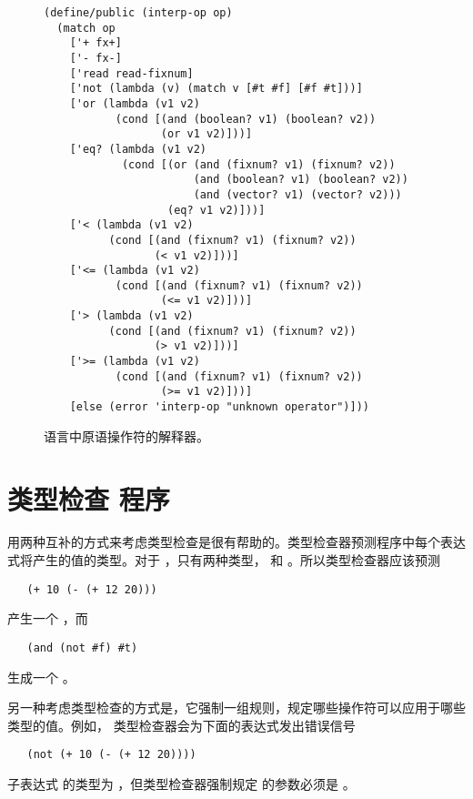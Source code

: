 \documentclass[11pt]{book}
\begin{document}
\begin{figure}[tbp]
\begin{lstlisting}
(define/public (interp-op op)
  (match op
    ['+ fx+]
    ['- fx-]
    ['read read-fixnum]
    ['not (lambda (v) (match v [#t #f] [#f #t]))]
    ['or (lambda (v1 v2)
           (cond [(and (boolean? v1) (boolean? v2))
                  (or v1 v2)]))]
    ['eq? (lambda (v1 v2)
            (cond [(or (and (fixnum? v1) (fixnum? v2))
                       (and (boolean? v1) (boolean? v2))
                       (and (vector? v1) (vector? v2)))
                   (eq? v1 v2)]))]
    ['< (lambda (v1 v2)
          (cond [(and (fixnum? v1) (fixnum? v2))
                 (< v1 v2)]))]
    ['<= (lambda (v1 v2)
           (cond [(and (fixnum? v1) (fixnum? v2))
                  (<= v1 v2)]))]
    ['> (lambda (v1 v2)
          (cond [(and (fixnum? v1) (fixnum? v2))
                 (> v1 v2)]))]
    ['>= (lambda (v1 v2)
           (cond [(and (fixnum? v1) (fixnum? v2))
                  (>= v1 v2)]))]
    [else (error 'interp-op "unknown operator")]))
\end{lstlisting}
\caption{ \LangIf{} 语言中原语操作符的解释器。}
\label{fig:interp-op-Rif}
\end{figure}


\section{类型检查 \LangIf{} 程序}
\label{sec:type-check-Rif}

用两种互补的方式来考虑类型检查是很有帮助的。类型检查器预测程序中每个表达式将产生的值的类型。对于 \LangIf{} ，只有两种类型，
 和  。所以类型检查器应该预测
\begin{lstlisting}
   (+ 10 (- (+ 12 20)))
\end{lstlisting}
产生一个  ，而
\begin{lstlisting}
   (and (not #f) #t)
\end{lstlisting}
生成一个  。

另一种考虑类型检查的方式是，它强制一组规则，规定哪些操作符可以应用于哪些类型的值。例如， \LangIf{} 类型检查器会为下面的表达式发出错误信号
\begin{lstlisting}
   (not (+ 10 (- (+ 12 20))))
\end{lstlisting}
子表达式  的类型为 
，但类型检查器强制规定 
的参数必须是  。
\end{document}
